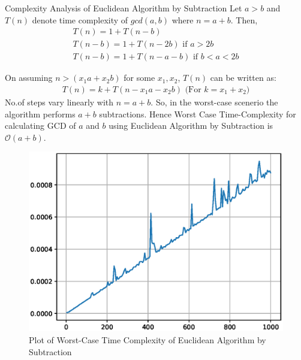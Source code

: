 \documentclass[8pt]{beamer}
\begin{document}
\begin{frame}[allowframebreaks]{Complexity Analysis of Euclidean Algorithm by Subtraction}
Let $a > b$ and $T(n)$ denote time complexity of $gcd(a,b)$ where $n = a+b$. Then,
\begin{align}
T(n) = 1 + T(n-b)\\
T(n-b) = 1 + T(n-2b) \text{ if $a > 2b$}\\
T(n-b) = 1 + T(n-a-b) \text{ if $b < a < 2b$}
\end{align}

On assuming $n > (x_{1}a + x_{2}b)$ for some $x_{1}, x_{2}$, $T(n)$ can be written as:
\begin{align}
T(n) = k + T(n - x_{1}a - x_{2}b) \text{ (For $k = x_{1} + x_{2}$)}
\end{align}
No.of steps vary linearly with $n=a+b$. So, in the worst-case scenerio the algorithm performs $a+b$ subtractions. Hence Worst Case Time-Complexity for calculating GCD of $a$ and  $b$ using Euclidean Algorithm by Subtraction is $\mathcal{O}(a + b)$.\\

\framebreak

\begin{figure}[!ht]
	\centering
	\includegraphics[scale=0.5]{figs/Euclid_Subtraction.eps}
	\caption{Plot of Worst-Case Time Complexity of Euclidean Algorithm by Subtraction}
	\label{fig:0}
\end{figure}


\end{frame}
\end{document}
